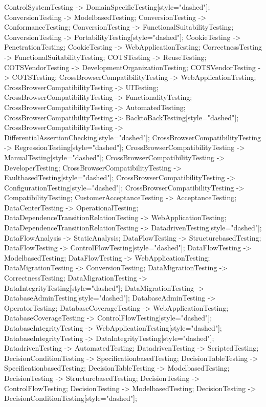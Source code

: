 \documentclass{article}
\begin{document}
{ControlSystemTesting -> DomainSpecificTesting[style="dashed"];
ConversionTesting -> ModelbasedTesting;
ConversionTesting -> ConformanceTesting;
ConversionTesting -> FunctionalSuitabilityTesting;
ConversionTesting -> PortabilityTesting[style="dashed"];
CookieTesting -> PenetrationTesting;
CookieTesting -> WebApplicationTesting;
CorrectnessTesting -> FunctionalSuitabilityTesting;
COTSTesting -> ReuseTesting;
COTSVendorTesting -> DevelopmentOrganizationTesting;
COTSVendorTesting -> COTSTesting;
CrossBrowserCompatibilityTesting -> WebApplicationTesting;
CrossBrowserCompatibilityTesting -> UITesting;
CrossBrowserCompatibilityTesting -> FunctionalityTesting;
CrossBrowserCompatibilityTesting -> AutomatedTesting;
CrossBrowserCompatibilityTesting -> BacktoBackTesting[style="dashed"];
CrossBrowserCompatibilityTesting -> DifferentialAssertionChecking[style="dashed"];
CrossBrowserCompatibilityTesting -> RegressionTesting[style="dashed"];
CrossBrowserCompatibilityTesting -> ManualTesting[style="dashed"];
CrossBrowserCompatibilityTesting -> DeveloperTesting;
CrossBrowserCompatibilityTesting -> FaultbasedTesting[style="dashed"];
CrossBrowserCompatibilityTesting -> ConfigurationTesting[style="dashed"];
CrossBrowserCompatibilityTesting -> CompatibilityTesting;
CustomerAcceptanceTesting -> AcceptanceTesting;
DataCenterTesting -> OperationalTesting;
DataDependenceTransitionRelationTesting -> WebApplicationTesting;
DataDependenceTransitionRelationTesting -> DatadrivenTesting[style="dashed"];
DataFlowAnalysis -> StaticAnalysis;
DataFlowTesting -> StructurebasedTesting;
DataFlowTesting -> ControlFlowTesting[style="dashed"];
DataFlowTesting -> ModelbasedTesting;
DataFlowTesting -> WebApplicationTesting;
DataMigrationTesting -> ConversionTesting;
DataMigrationTesting -> CorrectnessTesting;
DataMigrationTesting -> DataIntegrityTesting[style="dashed"];
DataMigrationTesting -> DatabaseAdminTesting[style="dashed"];
DatabaseAdminTesting -> OperatorTesting;
DatabaseCoverageTesting -> WebApplicationTesting;
DatabaseCoverageTesting -> ControlFlowTesting[style="dashed"];
DatabaseIntegrityTesting -> WebApplicationTesting[style="dashed"];
DatabaseIntegrityTesting -> DataIntegrityTesting[style="dashed"];
DatadrivenTesting -> AutomatedTesting;
DatadrivenTesting -> ScriptedTesting;
DecisionConditionTesting -> SpecificationbasedTesting;
DecisionTableTesting -> SpecificationbasedTesting;
DecisionTableTesting -> ModelbasedTesting;
DecisionTesting -> StructurebasedTesting;
DecisionTesting -> ControlFlowTesting;
DecisionTesting -> ModelbasedTesting;
DecisionTesting -> DecisionConditionTesting[style="dashed"];
}
\end{document}
